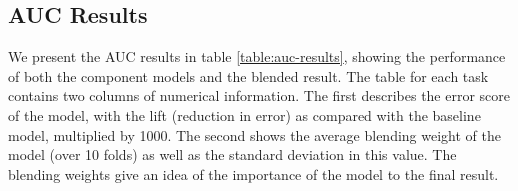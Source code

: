 \documentclass{article}
\begin{document}
\subsection{AUC Results}

We present the AUC results in table \ref{table:auc-results}, showing the performance of both the component models and the blended result.  The table for each task contains two columns of numerical information.  The first describes the error score of the model, with the lift (reduction in error) as compared with the baseline model, multiplied by 1000.  The second shows the average blending weight of the model (over 10 folds) as well as the standard deviation in this value.  The blending weights give an idea of the importance of the model to the final result.

\end{document}
